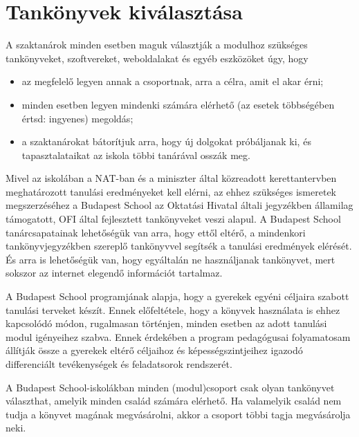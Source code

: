 \hypertarget{tankonyvek-kivalasztasa}{%
\section{Tankönyvek kiválasztása}\label{tankonyvek-kivalasztasa}}

A szaktanárok minden esetben maguk választják a modulhoz szükséges
tankönyveket, szoftvereket, weboldalakat és egyéb eszközöket úgy, hogy

\begin{itemize}
\tightlist
\item
  az megfelelő legyen annak a csoportnak, arra a célra, amit el akar
  érni;
\item
  minden esetben legyen mindenki számára elérhető (az esetek többségében
  értsd: ingyenes) megoldás;
\item
  a szaktanárokat bátorítjuk arra, hogy új dolgokat próbáljanak ki,
  és tapasztalataikat az iskola többi tanárával osszák meg.
\end{itemize}

Mivel az iskolában a NAT-ban és a miniszter által közreadott kerettantervben
meghatározott tanulási eredményeket kell elérni, az ehhez szükséges
ismeretek megszerzéséhez a Budapest School az Oktatási Hivatal általi
jegyzékben államilag támogatott, OFI által fejlesztett tankönyveket
veszi alapul. A Budapest School tanárcsapatainak lehetőségük van arra,
hogy ettől eltérő, a mindenkori tankönyvjegyzékben szereplő tankönyvvel
segítsék a tanulási eredmények elérését. És arra is lehetőségük van, hogy
egyáltalán ne használjanak tankönyvet, mert sokszor az internet elegendő
információt tartalmaz.

A Budapest School programjának alapja, hogy a gyerekek egyéni céljaira
szabott tanulási terveket készít. Ennek előfeltétele, hogy a könyvek
használata is ehhez kapcsolódó módon, rugalmasan történjen, minden
esetben az adott tanulási modul igényeihez szabva. Ennek érdekében a
program pedagógusai folyamatosam állítják össze a gyerekek eltérő
céljaihoz és képességszintjeihez igazodó differenciált tevékenységek és
feladatsorok rendszerét.

A Budapest School-iskolákban minden (modul)csoport csak olyan\break
tankönyvet választhat, amelyik minden család számára elérhető. Ha valamelyik család
nem tudja a könyvet magának megvásárolni, akkor a csoport többi tagja
megvásárolja neki.
